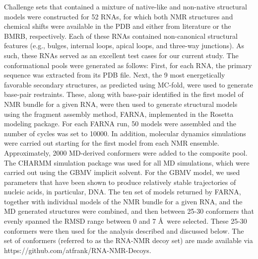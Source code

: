 \documentclass[journal=jcisd8,manuscript=article,layout=onecolumn]{achemso}
\begin{document}
Challenge sets that contained a mixture of native-like and non-native structural models were constructed for 52 RNAs, for which both NMR structures and chemical shifts were available in the PDB\cite{bernstein1977protein}  and either from literature or the BMRB\cite{ulrich2008biomagresbank}, respectively. Each of these RNAs contained non-canonical structural features (e.g., bulges, internal loops, apical loops, and three-way junctions). As such, these RNAs served as an excellent test cases for our current study.  The conformational pools were generated as follows: First, for each RNA, the primary sequence was extracted from its PDB file. Next, the 9 most energetically favorable secondary structures, as predicted using MC-fold\cite{parisien2008mc}, were used to generate base-pair restraints. These, along with base-pair identified in the first model of NMR bundle for a given RNA, were then used to generate structural models using the fragment assembly method, FARNA\cite{das2010atomic}, implemented in the Rosetta modeling package\cite{}. For each FARNA run, 50 models were assembled and the number of cycles was set to 10000.  In addition, molecular dynamics simulations were carried out starting for the first model from each NMR ensemble. Approximately, 2000 MD-derived conformers were added to the composite pool. The CHARMM simulation package\cite{brooks1983charmm} was used for all MD simulations, which were carried out using the GBMV implicit solvent\cite{lee2002novel, lee2003new}. For the GBMV model, we used parameters that have been shown to produce relatively stable trajectories of nucleic acids, in particular, DNA\cite{chocholouvsova2006implicit}. The ten set of models returned by FARNA, together with individual models of the NMR bundle for a given RNA, and the MD generated structures were combined, and then between 25-30 conformers that evenly spanned the RMSD range between 0 and 7 \AA\  were selected. These 25-30 conformers were then used for the analysis described and discussed below. The set of conformers (referred to as the RNA-NMR decoy set) are made available via https://github.com/atfrank/RNA-NMR-Decoys.
\end{document}
